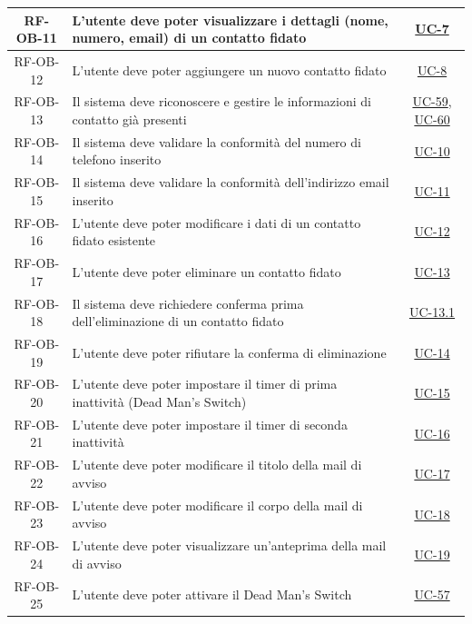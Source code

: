 \documentclass[a4paper,12pt]{article}
\begin{document}
\begin{center}
\begin{longtable}{|c|p{9cm}|c|}
\hline
\rowcolor{white}
RF-OB-11 & L'utente deve poter visualizzare i dettagli (nome, numero, email) di un contatto fidato & \hyperref[subsec:UC-7]{UC-7} \\
\hline
\rowcolor{gray!20}
RF-OB-12 & L'utente deve poter aggiungere un nuovo contatto fidato & \hyperref[subsec:UC-8]{UC-8} \\
\hline
\rowcolor{white}
RF-OB-13 & Il sistema deve riconoscere e gestire le informazioni di contatto già presenti & \hyperref[subsec:UC-59]{UC-59}, \hyperref[subsec:UC-60]{UC-60} \\
\hline
\rowcolor{gray!20}
RF-OB-14 & Il sistema deve validare la conformità del numero di telefono inserito & \hyperref[subsec:UC-10]{UC-10} \\
\hline
\rowcolor{white}
RF-OB-15 & Il sistema deve validare la conformità dell'indirizzo email inserito & \hyperref[subsec:UC-11]{UC-11} \\
\hline
\rowcolor{gray!20}
RF-OB-16 & L'utente deve poter modificare i dati di un contatto fidato esistente & \hyperref[subsec:UC-12]{UC-12} \\
\hline
\rowcolor{white}
RF-OB-17 & L'utente deve poter eliminare un contatto fidato & \hyperref[subsec:UC-13]{UC-13} \\
\hline
\rowcolor{gray!20}
RF-OB-18 & Il sistema deve richiedere conferma prima dell'eliminazione di un contatto fidato & \hyperref[subsec:UC-13.1]{UC-13.1} \\
\hline
\rowcolor{white}
RF-OB-19 & L'utente deve poter rifiutare la conferma di eliminazione & \hyperref[subsec:UC-14]{UC-14} \\
\hline
\rowcolor{gray!20}
RF-OB-20 & L'utente deve poter impostare il timer di prima inattività (Dead Man's Switch) & \hyperref[sec:UC-15]{UC-15} \\
\hline
\rowcolor{white}
RF-OB-21 & L'utente deve poter impostare il timer di seconda inattività & \hyperref[sec:UC-16]{UC-16} \\
\hline
\rowcolor{gray!20}
RF-OB-22 & L'utente deve poter modificare il titolo della mail di avviso & \hyperref[sec:UC-17]{UC-17} \\
\hline
\rowcolor{white}
RF-OB-23 & L'utente deve poter modificare il corpo della mail di avviso & \hyperref[sec:UC-18]{UC-18} \\
\hline
\rowcolor{gray!20}
RF-OB-24 & L'utente deve poter visualizzare un'anteprima della mail di avviso & \hyperref[sec:UC-19]{UC-19} \\
\hline
\rowcolor{white}
RF-OB-25 & L'utente deve poter attivare il Dead Man's Switch & \hyperref[sec:UC-57]{UC-57} \\

\end{longtable}
\end{center}
\end{document}
